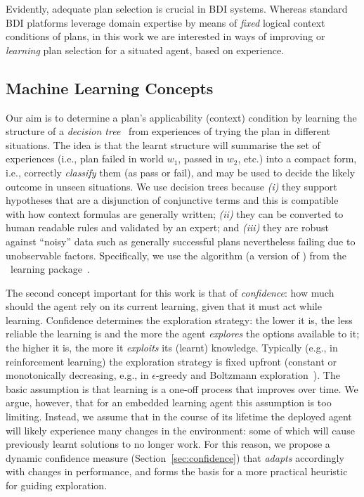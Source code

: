 Evidently, adequate plan selection is crucial in BDI systems. Whereas standard BDI platforms leverage domain expertise by means of \emph{fixed} logical context conditions of plans, in this work we are interested in ways of improving or \emph{learning} plan selection for a situated agent, based on experience.

\subsection{Machine Learning Concepts}

Our aim is to determine a plan's applicability (context) condition by learning the structure of a {\em decision tree}~\cite{Mitchell97:ML} from experiences of trying the plan in different situations. The idea is that the learnt structure will summarise the set of experiences (i.e., plan failed in world $w_1$, passed in $w_2$, etc.) into a compact form, i.e., correctly {\em classify} them (as pass or fail), and may be used to decide the likely outcome in unseen situations.
%
We use decision trees because \emph{(i)} they support hypotheses that are a disjunction of conjunctive terms and this is compatible with how context formulas are generally written; \emph{(ii)} they can be converted to human readable rules and validated by an expert; and \emph{(iii)} they are robust against ``noisy'' data such as generally successful plans nevertheless failing due to unobservable factors. 
%
Specifically, we use the algorithm  (a version of ) from the \weka\ learning package~\cite{weka99}.



The second concept important for this work is that of {\em confidence}: how much should the agent rely on its current learning, given that it must act while learning. Confidence determines the exploration strategy: the lower it is, the less reliable the learning is and the more the agent {\em explores} the options available to it; the higher it is, the more it {\em exploits} its (learnt) knowledge. Typically (e.g., in reinforcement learning) the exploration strategy is fixed upfront (constant or monotonically decreasing, e.g., in $\epsilon$-greedy and Boltzmann exploration~\cite{sutton98:reinforcement}). The basic assumption is that learning is a one-off process that improves over time. We argue, however, that for an embedded learning agent this assumption is too limiting. Instead, we assume that in the course of its lifetime the deployed agent will likely experience many changes in the environment: some of which will cause previously learnt solutions to no longer work. For this reason, we propose a dynamic confidence measure (Section~\ref{sec:confidence}) that {\em adapts} accordingly with changes in performance, and forms the basis for a more practical heuristic for guiding exploration.

